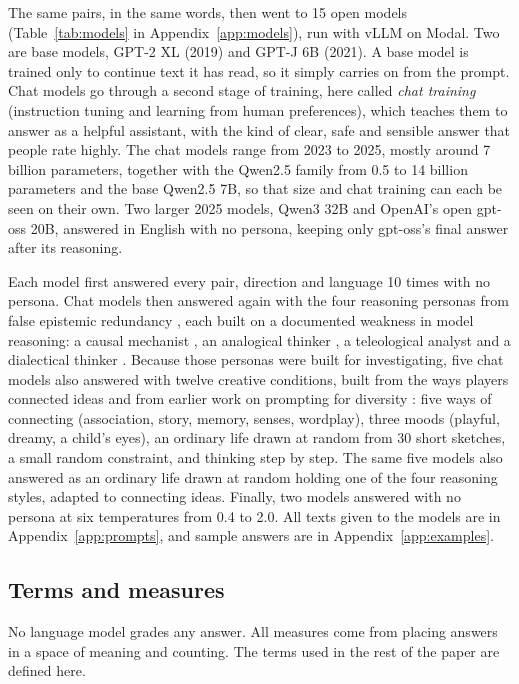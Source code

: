 \documentclass[11pt]{article}
\begin{document}
The same pairs, in the same words, then went to 15 open models (Table~\ref{tab:models} in Appendix~\ref{app:models}), run with vLLM on Modal. Two are base models, GPT-2 XL (2019) and GPT-J 6B (2021). A base model is trained only to continue text it has read, so it simply carries on from the prompt. Chat models go through a second stage of training, here called \emph{chat training} (instruction tuning and learning from human preferences), which teaches them to answer as a helpful assistant, with the kind of clear, safe and sensible answer that people rate highly. The chat models range from 2023 to 2025, mostly around 7 billion parameters, together with the Qwen2.5 family from 0.5 to 14 billion parameters and the base Qwen2.5 7B, so that size and chat training can each be seen on their own. Two larger 2025 models, Qwen3 32B and OpenAI's open gpt-oss 20B, answered in English with no persona, keeping only gpt-oss's final answer after its reasoning.

Each model first answered every pair, direction and language 10 times with no persona. Chat models then answered again with the four reasoning personas from false epistemic redundancy \citep{gallego2026fer}, each built on a documented weakness in model reasoning: a causal mechanist \citep{ullman2023}, an analogical thinker \citep{lewis2024}, a teleological analyst \citep{goh2026} and a dialectical thinker \citep{abbasloo2025}. Because those personas were built for investigating, five chat models also answered with twelve creative conditions, built from the ways players connected ideas and from earlier work on prompting for diversity \citep{deng2026,meincke2024}: five ways of connecting (association, story, memory, senses, wordplay), three moods (playful, dreamy, a child's eyes), an ordinary life drawn at random from 30 short sketches, a small random constraint, and thinking step by step. The same five models also answered as an ordinary life drawn at random holding one of the four reasoning styles, adapted to connecting ideas. Finally, two models answered with no persona at six temperatures from 0.4 to 2.0. All texts given to the models are in Appendix~\ref{app:prompts}, and sample answers are in Appendix~\ref{app:examples}.

\subsection{Terms and measures}
\label{sec:measures}

No language model grades any answer. All measures come from placing answers in a space of meaning and counting. The terms used in the rest of the paper are defined here.
\end{document}
